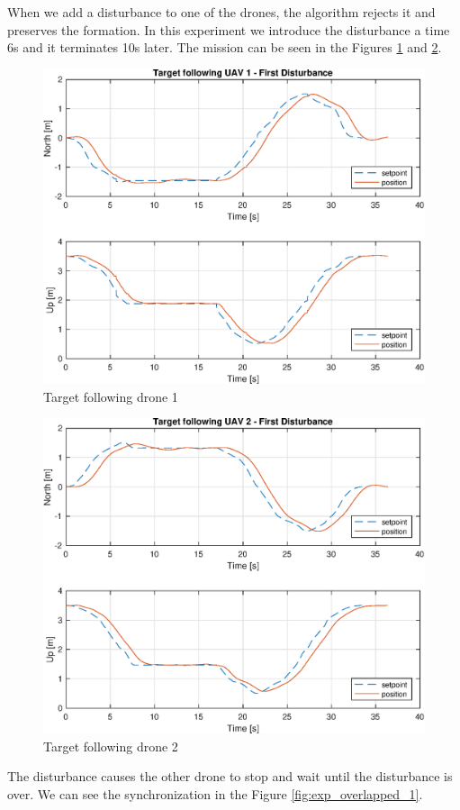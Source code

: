 When we add a disturbance to one of the drones, the algorithm rejects it and preserves
the formation. In this experiment we introduce the disturbance a time 6s and it
terminates 10s later. The mission can be seen in the Figures \ref{fig:exp_following_1_1}
and \ref{fig:exp_following_2_1}.

\begin{figure}
\centering
\includegraphics[width=0.7\linewidth]{chapters/chapter-05/figures/following_1_1.eps}
\caption{Target following drone 1}
\label{fig:exp_following_1_1}
\end{figure}

\begin{figure}
\centering
\includegraphics[width=0.7\linewidth]{chapters/chapter-05/figures/following_2_1.eps}
\caption{Target following drone 2}
\label{fig:exp_following_2_1}
\end{figure}

The disturbance causes the other drone to stop and wait until the disturbance
is over. We can see the synchronization in the Figure \ref{fig:exp_overlapped_1}.

